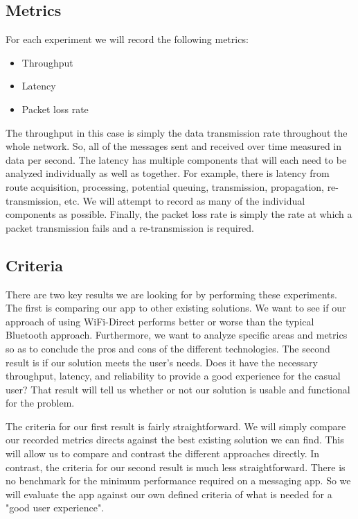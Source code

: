 \documentclass[10pt]{article}
\begin{document}
\subsection{Metrics}

For each experiment we will record the following metrics:
\begin{itemize}
    \item Throughput
    \item Latency
    \item Packet loss rate
\end{itemize}
The throughput in this case is simply the data transmission rate throughout the whole network. So, all of the messages sent and received over time measured in data per second. The latency has multiple components that will each need to be analyzed individually as well as together. For example, there is latency from route acquisition, processing, potential queuing, transmission, propagation, re-transmission, etc. We will attempt to record as many of the individual components as possible. Finally, the packet loss rate is simply the rate at which a packet transmission fails and a re-transmission is required.

\subsection{Criteria}

There are two key results we are looking for by performing these experiments. The first is comparing our app to other existing solutions. We want to see if our approach of using WiFi-Direct performs better or worse than the typical Bluetooth approach. Furthermore, we want to analyze specific areas and metrics so as to conclude the pros and cons of the different technologies. The second result is if our solution meets the user's needs. Does it have the necessary throughput, latency, and reliability to provide a good experience for the casual user? That result will tell us whether or not our solution is usable and functional for the problem.

The criteria for our first result is fairly straightforward. We will simply compare our recorded metrics directs against the best existing solution we can find. This will allow us to compare and contrast the different approaches directly. In contrast, the criteria for our second result is much less straightforward. There is no benchmark for the minimum performance required on a messaging app. So we will evaluate the app against our own defined criteria of what is needed for a "good user experience".
\end{document}
